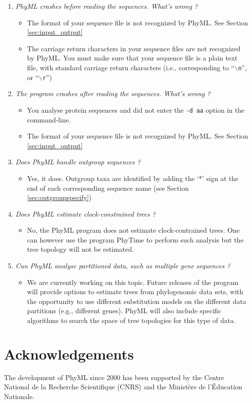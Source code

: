 \documentclass[a4paper,12pt]{article}
\newcommand{\x}[1]{\texttt{#1}}
\begin{document}
\begin{enumerate}
\item {\it PhyML crashes before reading the sequences. What's wrong ?}\\
\begin{itemize}
\item The format of your sequence file is not recognized by PhyML. See Section \ref{sec:input_output}
\item The carriage return characters in your sequence files are not recognized by PhyML. You must
  make sure that your sequence file is a plain text file, with standard carriage return characters (i.e.,
  corresponding to ``$\backslash$\x{n}'', or ``$\backslash$\x{r}'')
\end{itemize}
\item {\it The program crashes after reading the sequences. What's wrong ?}\\
\begin{itemize}
\item You analyse protein sequences and did not enter the \x{-d aa} option in the command-line.
\item The format of your sequence file is not recognized by PhyML. See Section \ref{sec:input_output}
\end{itemize}
\item {\it Does PhyML handle outgroup sequences ?}\\
\begin{itemize}
\item Yes, it does. Outgroup taxa are identified by adding the `*' sign at the end of each
  corresponding sequence name (see Section \ref{sec:outgroupspecify})
\end{itemize}
\item {\it Does PhyML estimate clock-constrained trees ?}\\
\begin{itemize}
\item No, the PhyML program does not estimate clock-contrained trees. One can however use the
  program PhyTime to perform such analysis but the tree topology will not be estimated.
\end{itemize}
\item {\it Can PhyML analyse partitioned data, such as multiple gene sequences ?}\\
\begin{itemize}
\item We are currently  working on this topic.  Future releases of  the program will provide options
to estimate  trees from phylogenomic data sets,  with the opportunity to  use different substitution
models on  the different data partitions (e.g.,  different genes). PhyML will  also include specific
algorithms to search the space of tree topologies for this type of data.
\end{itemize}
\end{enumerate}



\section{Acknowledgements}
The development of PhyML since 2000 has been supported by the Centre National de la Recherche
Scientifique (CNRS) and the Minist\`ere de l'\'Education Nationale.




\printindex
\end{document}
